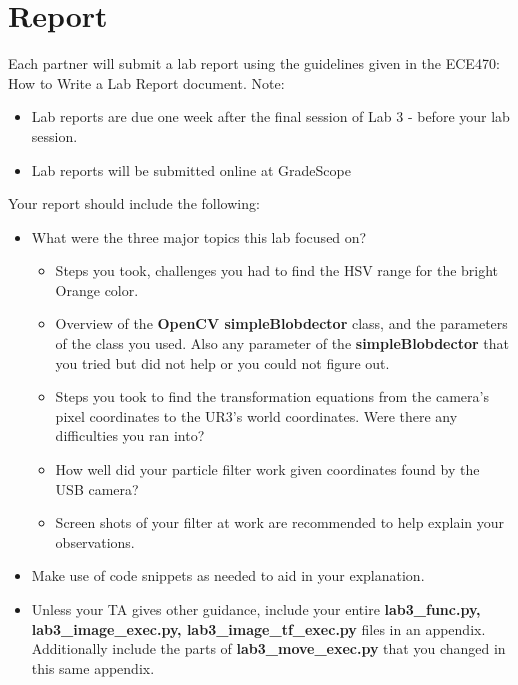 \section{Report}
Each partner will submit a lab report using the guidelines given in the ECE470: How to Write a Lab Report document.  Note:
\begin{itemize}
\item Lab reports are due one week after the final session of Lab 3 - before your lab session.
\item Lab reports will be submitted online at GradeScope
\end{itemize}
Your report should include the following:
\begin{itemize}
\item What were the three major topics this lab focused on?
\begin{itemize}
\item Steps you took, challenges you had to find the HSV range for the bright Orange color. 
\item Overview of the \textbf{OpenCV simpleBlobdector} class, and the parameters of the class you used.  Also any parameter of the \textbf{simpleBlobdector} that you tried but did not help or you could not figure out.  
\item Steps you took to find the transformation equations from the camera’s pixel coordinates to the UR3’s world coordinates.  Were there any difficulties you ran into?
\item How well did your particle filter work given coordinates found by the USB camera?
\item Screen shots of your filter at work are recommended to help explain your observations.
\end{itemize}
\item Make use of code snippets as needed to aid in your explanation.
\item Unless your TA gives other guidance, include your entire \textbf{lab3\_func.py, lab3\_image\_exec.py, lab3\_image\_tf\_exec.py} files in an appendix.  Additionally include the parts of \textbf{lab3\_move\_exec.py} that you changed in this same appendix.  
\end{itemize}

